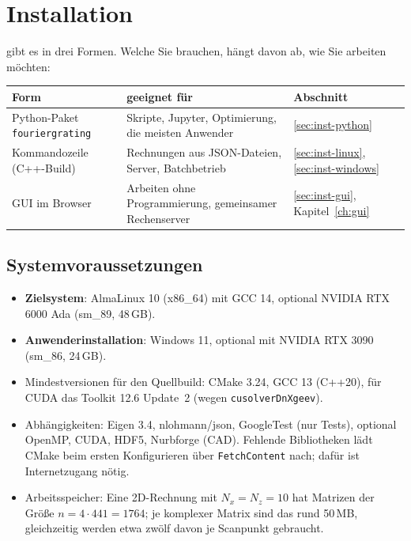 \chapter{Installation}\label{ch:installation}

\FG{} gibt es in drei Formen. Welche Sie brauchen, hängt davon ab, wie Sie arbeiten möchten:
\begin{center}
\small
\begin{tabularx}{\linewidth}{lYl}
\toprule
Form & geeignet für & Abschnitt \\
\midrule
Python-Paket \texttt{fouriergrating} & Skripte, Jupyter, Optimierung, die meisten Anwender & \ref{sec:inst-python} \\
Kommandozeile  (C++-Build) & Rechnungen aus JSON-Dateien, Server, Batchbetrieb & \ref{sec:inst-linux}, \ref{sec:inst-windows} \\
GUI im Browser & Arbeiten ohne Programmierung, gemeinsamer Rechenserver & \ref{sec:inst-gui}, Kapitel~\ref{ch:gui} \\
\bottomrule
\end{tabularx}
\end{center}

\section{Systemvoraussetzungen}
\begin{itemize}
  \item \textbf{Zielsystem}: AlmaLinux 10 (x86\_64) mit GCC 14, optional NVIDIA RTX 6000 Ada (sm\_89, 48\,GB).
  \item \textbf{Anwenderinstallation}: Windows 11, optional mit NVIDIA RTX 3090 (sm\_86, 24\,GB).
  \item Mindestversionen für den Quellbuild: CMake 3.24, GCC 13 (C++20), für CUDA das Toolkit 12.6 Update~2
        (wegen \texttt{cusolverDnXgeev}).
  \item Abhängigkeiten: Eigen 3.4, nlohmann/json, GoogleTest (nur Tests), optional OpenMP, CUDA, HDF5, Nurbforge
        (CAD). Fehlende Bibliotheken lädt CMake beim ersten Konfigurieren über \texttt{FetchContent} nach; dafür ist
        Internetzugang nötig.
  \item Arbeitsspeicher: Eine 2D-Rechnung mit $N_x=N_z=10$ hat Matrizen der Größe $n = 4\cdot441=1764$; je komplexer
        Matrix sind das rund 50\,MB, gleichzeitig werden etwa zwölf davon je Scanpunkt gebraucht.
\end{itemize}

